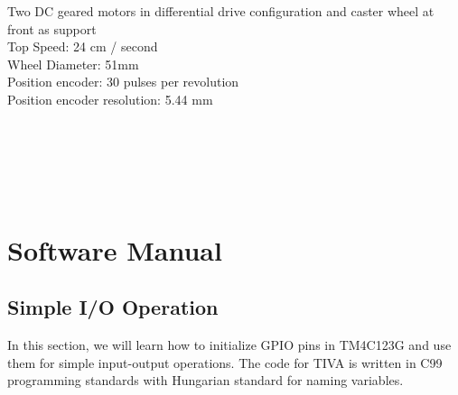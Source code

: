 \documentclass[a4paper,10pt,oneside]{article}
\begin{document}
{			{Two DC geared motors in differential drive configuration and caster wheel at front as support\\
			Top Speed: 24 cm / second\\
			Wheel Diameter: 51mm\\
			Position encoder: 30 pulses per revolution\\
			Position encoder resolution: 5.44 mm\\
			\\
			\\
			\\
			\\
			\\}
		\newpage
		\section{Software Manual}
		
		\subsection{\textbf{Simple I/O Operation}}
			{In this section, we will learn how to initialize GPIO pins in TM4C123G and use them for simple input-output operations. The code for TIVA is written in C99 programming standards with Hungarian standard for naming variables. }
}
\end{document}
